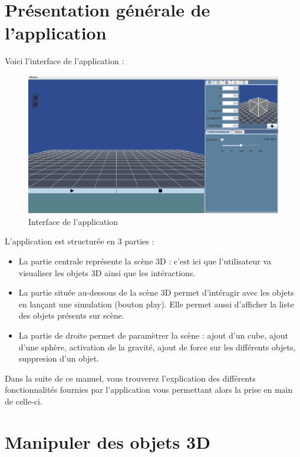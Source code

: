 \documentclass[11pt]{report}
\begin{document}
\chapter{Présentation générale de l'application}

Voici l'interface de l'application :

\begin{figure}[h]
  \centering
  \includegraphics[scale=0.4]{./interface.png}
  \caption{Interface de l'application}
\end{figure}

L'application est structurée en 3 parties :
\begin{itemize}
  \item La partie centrale représente la scène 3D : c'est ici que l'utilisateur va visualiser
  les objets 3D ainsi que les intéractions.
  \item La partie située au-dessous de la scène 3D permet d'intéragir avec les objets en 
  lançant une simulation (bouton play). Elle permet aussi d'afficher la liste des objets présents 
  sur scène.
  \item La partie de droite permet de paramètrer la scène : ajout d'un cube, ajout d'une sphère,
  activation de la gravité, ajout de force sur les différents objets, suppresion d'un objet.\newline 
\end{itemize}


Dans la suite de ce manuel, vous trouverez l'explication des différents fonctionnalités fournies
par l'application vous permettant alors la prise en main de celle-ci.


\chapter{Manipuler des objets 3D}
\end{document}
